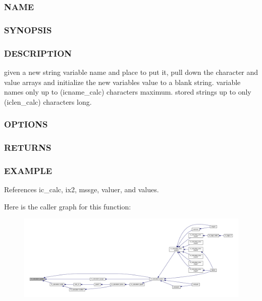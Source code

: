 \subsubsection*{N\+A\+ME}

\subsubsection*{S\+Y\+N\+O\+P\+S\+IS}

\subsubsection*{D\+E\+S\+C\+R\+I\+P\+T\+I\+ON}

given a new string variable name and place to put it, pull down the character and value arrays and initialize the new variable\textquotesingle{}s value to a blank string. variable names only up to (icname\+\_\+calc) characters maximum. stored strings up to only (iclen\+\_\+calc) characters long. \subsubsection*{O\+P\+T\+I\+O\+NS}

\subsubsection*{R\+E\+T\+U\+R\+NS}

\subsubsection*{E\+X\+A\+M\+P\+LE}

References ic\+\_\+calc, ix2, mssge, valuer, and values.

Here is the caller graph for this function\+:
\nopagebreak
\begin{figure}[H]
\begin{center}
\leavevmode
\includegraphics[width=350pt]{namespacem__calculator_a6d54137f485f8d2ed239b58e44cdb732_icgraph}
\end{center}
\end{figure}
\mbox{\label{namespacem__calculator_a6fc04e994f45d649d5e412e0013bf127}} 
